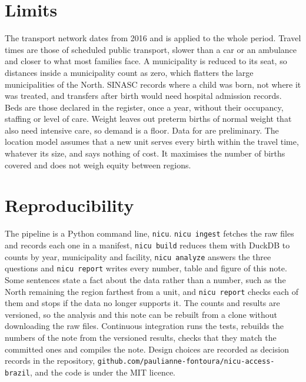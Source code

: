 \documentclass[11pt,a4paper]{article}
\begin{document}
\begin{table}[t]
\centering
\caption{The ten sites of the location model, births of \pooledYears{} against
the SUS units of \lastYear. Births reached are births at risk a year, living more
than two hours from any SUS NICU, that the site would bring within two hours. Years chosen counts the years, out of five, in which the model solved on
that year alone also chooses the site.}
\label{tab:sites}
\small

\end{table}

\section{Limits}
The transport network dates from 2016 and is applied to the whole period. Travel
times are those of scheduled public transport, slower than a car or an ambulance
and closer to what most families face. A municipality is reduced to its seat, so
distances inside a municipality count as zero, which flatters the large
municipalities of the North. SINASC records where a child was born, not where it
was treated, and transfers after birth would need hospital admission records.
Beds are those declared in the register, once a year, without their occupancy,
staffing or level of care. Weight leaves out preterm births of normal weight
that also need intensive care, so demand is a floor. Data for \lastYear{} are
preliminary. The location model assumes that a new unit serves every birth
within the travel time, whatever its size, and says nothing of cost. It maximises
the number of births covered and does not weigh equity between regions.

\section{Reproducibility}
The pipeline is a Python command line, \texttt{nicu}. \texttt{nicu ingest}
fetches the raw files and records each one in a manifest, \texttt{nicu build}
reduces them with DuckDB to counts by year, municipality and facility,
\texttt{nicu analyze} answers the three questions and \texttt{nicu report} writes
every number, table and figure of this note. Some sentences state a fact about
the data rather than a number, such as the North remaining the region farthest
from a unit, and \texttt{nicu report} checks each of them and stops if the data
no longer supports it. The counts and results are versioned, so the analysis and
this note can be rebuilt from a clone without downloading the raw files.
Continuous integration runs the tests, rebuilds the numbers of the note from the
versioned results, checks that they match the committed ones and compiles the
note. Design choices are recorded as decision records in the repository,
\texttt{github.com/paulianne-fontoura/nicu-access-brazil}, and the code is under
the MIT licence.
\end{document}
